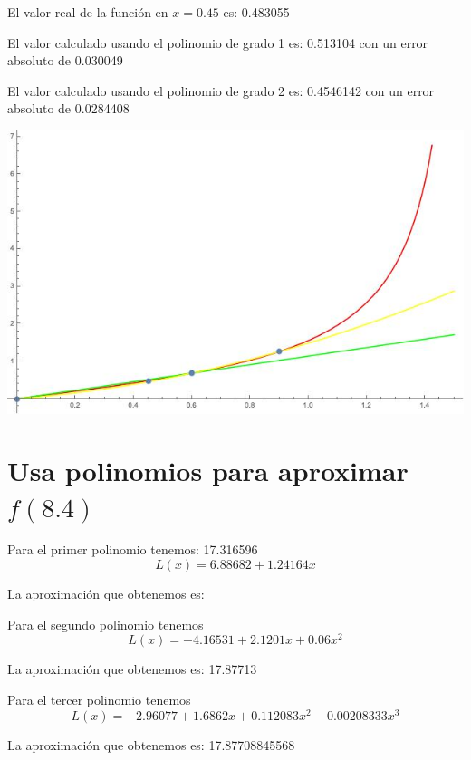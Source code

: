 \documentclass{article}
\begin{document}
El valor real de la función en $x=0.45$ es: 0.483055

El valor calculado usando el polinomio de grado 1 es: 0.513104 con un error absoluto de 0.030049

El valor calculado usando el polinomio de grado 2 es: 0.4546142 con un error absoluto de 0.0284408

\includegraphics[scale=0.5]{Grafica4.jpeg}

\section{Usa polinomios para aproximar $f(8.4)$}

Para el primer polinomio tenemos: 17.316596
$$L(x) = 6.88682 + 1.24164 x$$

La aproximación que obtenemos es:

Para el segundo polinomio tenemos
$$L(x) = -4.16531+2.1201 x+0.06 x^2 $$

La aproximación que obtenemos es: 17.87713

Para el tercer polinomio tenemos
$$L(x) = -2.96077+1.6862 x+0.112083 x^2-0.00208333 x^3$$

La aproximación que obtenemos es: 17.87708845568
\end{document}
